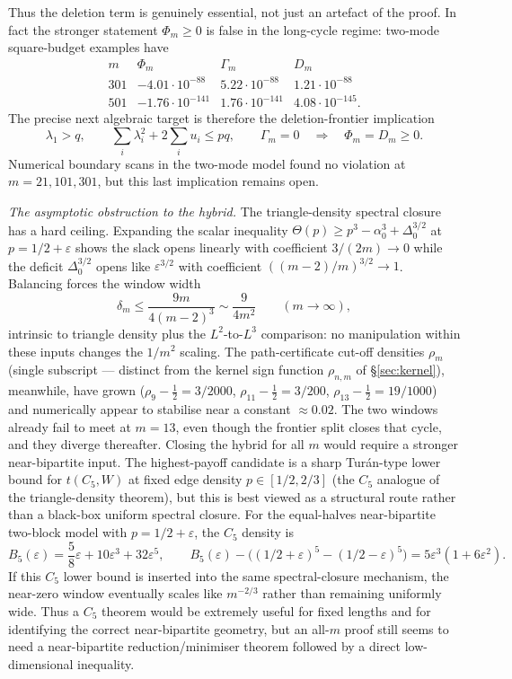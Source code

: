 \documentclass[11pt]{article}
\newcommand{\eps}{\varepsilon}
\begin{document}
Thus the deletion term is genuinely essential, not just an artefact of the proof.  In fact the stronger statement $\Phi_m\ge0$ is false in the long-cycle regime: two-mode square-budget examples have
\[
\begin{array}{c|c|c|c}
m&\Phi_m&\Gamma_m&D_m\\ \hline
301&-4.01\cdot10^{-88}&5.22\cdot10^{-88}&1.21\cdot10^{-88}\\
501&-1.76\cdot10^{-141}&1.76\cdot10^{-141}&4.08\cdot10^{-145}.
\end{array}
\]
The precise next algebraic target is therefore the deletion-frontier implication
\[
        \lambda_1>q,\qquad \sum_i\lambda_i^2+2\sum_i u_i\le pq,\qquad
        \Gamma_m=0
        \quad\Longrightarrow\quad
        \Phi_m=D_m\ge0.
\]
Numerical boundary scans in the two-mode model found no violation at $m=21,101,301$, but this last implication remains open.

\medskip\noindent\emph{The asymptotic obstruction to the hybrid.}
The triangle-density spectral closure has a hard ceiling.  Expanding the scalar inequality $\Theta(p)\ge p^3-\alpha_0^3+\Delta_0^{3/2}$ at $p=1/2+\eps$ shows the slack opens linearly with coefficient $3/(2m)\to0$ while the deficit $\Delta_0^{3/2}$ opens like $\eps^{3/2}$ with coefficient $((m-2)/m)^{3/2}\to1$.  Balancing forces the window width
\[
        \delta_m\le\frac{9m}{4(m-2)^3}\sim\frac{9}{4m^2}
        \qquad(m\to\infty),
\]
intrinsic to triangle density plus the $L^2$-to-$L^3$ comparison: no manipulation within these inputs changes the $1/m^2$ scaling.  The path-certificate cut-off densities $\rho_m$ (single subscript --- distinct from the kernel sign function $\rho_{n,m}$ of \S\ref{sec:kernel}), meanwhile, have grown ($\rho_9-\tfrac12=3/2000$, $\rho_{11}-\tfrac12=3/200$, $\rho_{13}-\tfrac12=19/1000$) and numerically appear to stabilise near a constant $\approx0.02$.  The two windows already fail to meet at $m=13$, even though the frontier split closes that cycle, and they diverge thereafter.  Closing the hybrid for all $m$ would require a stronger near-bipartite input.  The highest-payoff candidate is a sharp Tur\'an-type lower bound for $t(C_5,W)$ at fixed edge density $p\in[1/2,2/3]$ (the $C_5$ analogue of the triangle-density theorem), but this is best viewed as a structural route rather than a black-box uniform spectral closure.  For the equal-halves near-bipartite two-block model with $p=1/2+\eps$, the $C_5$ density is
\[
        B_5(\eps)=\frac58\eps+10\eps^3+32\eps^5,
        \qquad
        B_5(\eps)-\bigl((1/2+\eps)^5-(1/2-\eps)^5\bigr)
        =5\eps^3(1+6\eps^2).
\]
If this $C_5$ lower bound is inserted into the same spectral-closure mechanism, the near-zero window eventually scales like $m^{-2/3}$ rather than remaining uniformly wide.  Thus a $C_5$ theorem would be extremely useful for fixed lengths and for identifying the correct near-bipartite geometry, but an all-$m$ proof still seems to need a near-bipartite reduction/minimiser theorem followed by a direct low-dimensional inequality.
\end{document}
